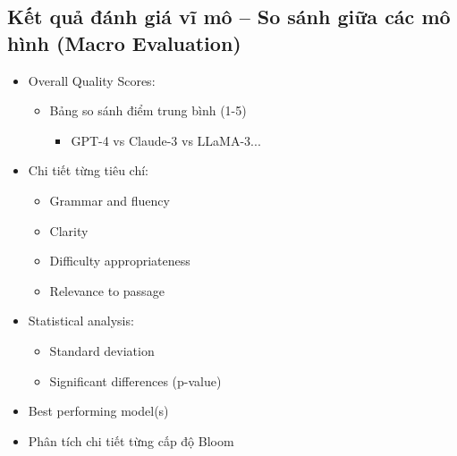 \subsection{Kết quả đánh giá vĩ mô -- So sánh giữa các mô hình (Macro Evaluation)}
\begin{itemize}
    \item Overall Quality Scores:
    \begin{itemize}
        \item Bảng so sánh điểm trung bình (1-5)
        \begin{itemize}
            \item GPT-4 vs Claude-3 vs LLaMA-3...
        \end{itemize}
    \end{itemize}
    \item Chi tiết từng tiêu chí:
    \begin{itemize}
        \item Grammar and fluency
        \item Clarity
        \item Difficulty appropriateness
        \item Relevance to passage
    \end{itemize}
    \item Statistical analysis:
    \begin{itemize}
        \item Standard deviation
        \item Significant differences (p-value)
    \end{itemize}
    \item Best performing model(s)
    \item Phân tích chi tiết từng cấp độ Bloom
\end{itemize}

